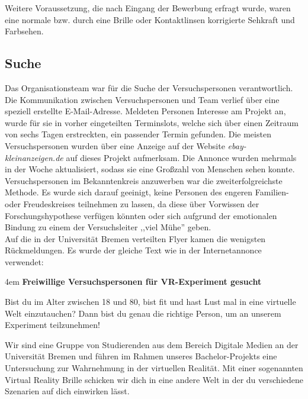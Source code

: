 \documentclass{Bericht}
\begin{document}

Weitere Voraussetzung, die nach Eingang der Bewerbung erfragt wurde, waren eine normale bzw. durch eine Brille oder Kontaktlinsen korrigierte Sehkraft und Farbsehen. 

\subsection{Suche}
Das Organisationsteam war für die Suche der Versuchspersonen verantwortlich. Die Kommunikation zwischen Versuchspersonen und Team verlief über eine speziell erstellte E-Mail-Adresse. Meldeten Personen Interesse am Projekt an, wurde für sie in vorher eingeteilten Terminslots, welche sich über einen Zeitraum von sechs Tagen erstreckten, ein passender Termin gefunden.
Die meisten Versuchspersonen wurden über eine Anzeige auf der Website \textit{ebay-kleinanzeigen.de} auf dieses Projekt aufmerksam. Die Annonce wurden mehrmals in der Woche aktualisiert, sodass sie eine Großzahl von Menschen sehen konnte.\\
Versuchspersonen im Bekanntenkreis anzuwerben war die zweiterfolgreichste Methode. Es wurde sich darauf geeinigt, keine Personen des engeren Familien- oder Freudeskreises teilnehmen zu lassen, da diese über Vorwissen der Forschungshypothese verfügen könnten oder sich aufgrund der emotionalen Bindung zu einem der Versuchsleiter ,,viel Mühe'' geben.\\
Auf die in der Universität Bremen verteilten Flyer kamen die wenigsten Rückmeldungen. Es wurde der gleiche Text wie in der Internetannonce verwendet:\\

\par
\begingroup
\leftskip4em
\textbf{Freiwillige Versuchspersonen für VR-Experiment gesucht}

Bist du im Alter zwischen 18 und 80, bist fit und hast Lust mal in eine virtuelle Welt einzutauchen? Dann bist du genau die richtige Person, um an unserem Experiment teilzunehmen!

Wir sind eine Gruppe von Studierenden aus dem Bereich Digitale Medien an der Universität Bremen und führen im Rahmen unseres Bachelor-Projekts eine Untersuchung zur Wahrnehmung in der virtuellen Realität. Mit einer sogenannten Virtual Reality Brille schicken wir dich in eine andere Welt in der du verschiedene Szenarien auf dich einwirken lässt.
\end{document}
